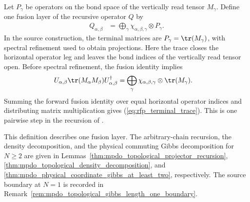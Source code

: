 \begin{definition}%
    \label{def:mpdo_topological_projector_one_fusion}
    \leanok
    Let $P_\gamma$ be operators on the bond space of the vertically read
    tensor $M_\gamma$. Define one fusion layer of the recursive operator $Q$
    by
    \begin{align}
        Q_{\alpha,\beta}
         & =\bigoplus_\gamma
        \chi_{\alpha,\beta,\gamma}\otimes P_\gamma.
        \label{eq:rfp_one_fusion}
    \end{align}
    In the source construction, the terminal matrices are
    $P_\gamma=\tr(M_\gamma)$, with spectral refinement used to obtain
    projections. Here the trace closes the horizontal operator leg and
    leaves the bond indices of the vertically read tensor open.
    Before spectral refinement, the fusion identity implies
    \begin{align}
        U_{\alpha,\beta}\tr(M_\alpha M_\beta)
        U_{\alpha,\beta}^{\dagger}
         & =\bigoplus_\gamma
        \chi_{\alpha,\beta,\gamma}\otimes
        \tr(M_\gamma).
        \label{eq:rfp_terminal_trace}
    \end{align}
    Summing the forward fusion identity over equal horizontal
    operator indices and distributing matrix multiplication
    gives (\ref{eq:rfp_terminal_trace}).
    This is one pairwise step in the recursion of
    \cite[lines~999--1010]{Cirac2016MPDO_arXiv}.

    This definition describes one fusion layer. The arbitrary-chain
    recursion, the density decomposition, and the physical commuting Gibbs
    decomposition for $N\geq2$ are given in
    Lemmas~\ref{thm:mpdo_topological_projector_recursion},
    \ref{thm:mpdo_topological_density_decomposition}, and
    \ref{thm:mpdo_physical_coordinate_gibbs_at_least_two}, respectively.
    The source boundary at $N=1$ is recorded in
    Remark~\ref{rem:mpdo_topological_gibbs_length_one_boundary}.
\end{definition}

